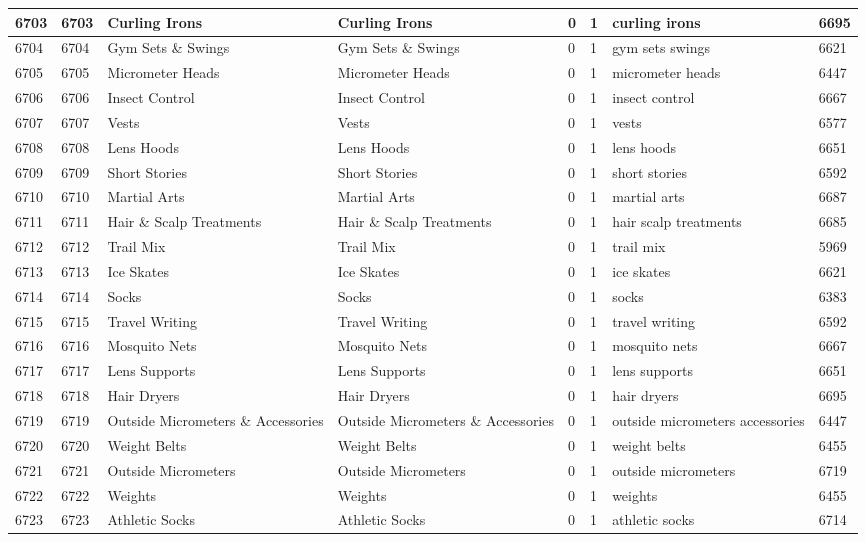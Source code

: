 \begin{longtable}{|l|l|l|l|l|l|l|l|}
6703 & 6703 & Curling Irons & Curling Irons & 0 & 1 & curling irons & 6695 \\ \hline 
6704 & 6704 & Gym Sets \& Swings & Gym Sets \& Swings & 0 & 1 & gym sets swings & 6621 \\ \hline 
6705 & 6705 & Micrometer Heads & Micrometer Heads & 0 & 1 & micrometer heads & 6447 \\ \hline 
6706 & 6706 & Insect Control & Insect Control & 0 & 1 & insect control & 6667 \\ \hline 
6707 & 6707 & Vests & Vests & 0 & 1 & vests & 6577 \\ \hline 
6708 & 6708 & Lens Hoods & Lens Hoods & 0 & 1 & lens hoods & 6651 \\ \hline 
6709 & 6709 & Short Stories & Short Stories & 0 & 1 & short stories & 6592 \\ \hline 
6710 & 6710 & Martial Arts & Martial Arts & 0 & 1 & martial arts & 6687 \\ \hline 
6711 & 6711 & Hair \& Scalp Treatments & Hair \& Scalp Treatments & 0 & 1 & hair scalp treatments & 6685 \\ \hline 
6712 & 6712 & Trail Mix & Trail Mix & 0 & 1 & trail mix & 5969 \\ \hline 
6713 & 6713 & Ice Skates & Ice Skates & 0 & 1 & ice skates & 6621 \\ \hline 
6714 & 6714 & Socks & Socks & 0 & 1 & socks & 6383 \\ \hline 
6715 & 6715 & Travel Writing & Travel Writing & 0 & 1 & travel writing & 6592 \\ \hline 
6716 & 6716 & Mosquito Nets & Mosquito Nets & 0 & 1 & mosquito nets & 6667 \\ \hline 
6717 & 6717 & Lens Supports & Lens Supports & 0 & 1 & lens supports & 6651 \\ \hline 
6718 & 6718 & Hair Dryers & Hair Dryers & 0 & 1 & hair dryers & 6695 \\ \hline 
6719 & 6719 & Outside Micrometers \& Accessories & Outside Micrometers \& Accessories & 0 & 1 & outside micrometers accessories & 6447 \\ \hline 
6720 & 6720 & Weight Belts & Weight Belts & 0 & 1 & weight belts & 6455 \\ \hline 
6721 & 6721 & Outside Micrometers & Outside Micrometers & 0 & 1 & outside micrometers & 6719 \\ \hline 
6722 & 6722 & Weights & Weights & 0 & 1 & weights & 6455 \\ \hline 
6723 & 6723 & Athletic Socks & Athletic Socks & 0 & 1 & athletic socks & 6714 \\ \hline 

\end{longtable}
